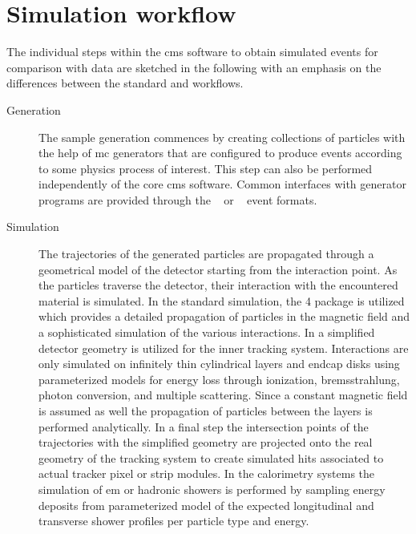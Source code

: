 \section{Simulation workflow}
\label{sec:fsim-workflow}

The individual steps within the \gls{cms} software to obtain simulated events for comparison with data are sketched in the following with an emphasis on the differences between the standard and \FSIM workflows.

\begin{description}
\item[Generation] The sample generation commences by creating collections of particles with the help of \acrfull{mc} generators that are configured to produce events according to some physics process of interest. This step can also be performed independently of the core \gls{cms} software. Common interfaces with generator programs are provided through the \HEPMC[format=hyperbf]~\cite{Dobbs:2001ck,hepmc} or \LHEF[format=hyperbf]~\cite{Alwall:2006yp} event formats.

\item[Simulation] The trajectories of the generated particles are propagated through a geometrical model of the detector starting from the interaction point. As the particles traverse the detector, their interaction with the encountered material is simulated. In the standard simulation, the \GEANT{}4 package is utilized which provides a detailed propagation of particles in the magnetic field and a sophisticated simulation of the various interactions. 
In \FSIM a simplified detector geometry is utilized for the inner tracking system. Interactions are only simulated on infinitely thin cylindrical layers and endcap disks using parameterized models for energy loss through ionization, bremsstrahlung, photon conversion, and multiple scattering. Since a constant magnetic field is assumed as well the propagation of particles between the layers is performed analytically. In a final step the intersection points of the trajectories with the simplified geometry are projected onto the real geometry of the tracking system to create simulated hits associated to actual tracker pixel or strip modules. In the calorimetry systems the simulation of \gls{em} or hadronic showers is performed by sampling energy deposits from parameterized model of the expected longitudinal and transverse shower profiles per particle type and energy.


\end{description}
